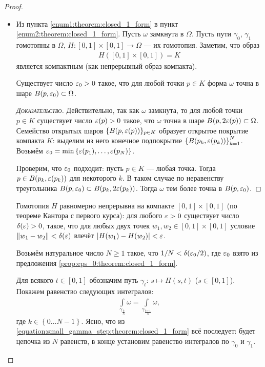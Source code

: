 \documentclass[../complex-analysis.tex]{subfiles}
\begin{document}
\begin{proof}\
 \begin{itemize}
  \item Из пункта \ref{enum1:theorem:closed_1_form} в пункт \ref{enum2:theorem:closed_1_form}. Пусть $\omega$ замкнута в $\Omega$. Пусть пути $\gamma_0$, $\gamma_1$ гомотопны в $\Omega$, $H \colon [0,1] \times [0,1] \to \Omega$ --- их гомотопия. Заметим, что образ
   \begin{align*}
    H([0,1] \times [0,1]) = K
   \end{align*}  является компактным (как непрерывный образ компакта).
   \begin{prop}
    \label{prop:eps_0:theorem:closed_1_form}
    Существует число $\varepsilon_0 > 0$ такое, что для любой точки $p \in K$ форма $\omega$ точна в шаре $B(p,\varepsilon_0) \subset \Omega$. 
   \end{prop}
   \begin{proof}[\normalfont\textsc{Доказательство}]
    Действительно, так как $\omega$ замкнута, то для любой точки $p \in K$ существует число $\varepsilon(p) > 0$ такое, что $\omega$ точна в шаре $B(p,2\varepsilon(p))\subset\Omega$. Семейство открытых шаров $\{B(p,\varepsilon(p))\}_{p \in K}$ образует открытое покрытие компакта $K$:  выделим из него конечное подпокрытие $\left\{ B(p_k, \varepsilon(p_k)) \right\}_{k=1}^{N}$. Возьмём $\varepsilon_0 = \min \left\{ \varepsilon(p_1), \ldots, \varepsilon(p_N) \right\}$.

    Проверим, что $\varepsilon_0$ подходит: пусть $p \in K$ --- любая точка. Тогда $p \in B(p_k,\varepsilon(p_k))$ для некоторого $k$. В таком случае по неравенству треугольника $B(p, \varepsilon_0)\subset B(p_k,2\varepsilon(p_k))$. Тогда $\omega$ тем более точна в $B(p,\varepsilon_0)$.
   \end{proof}

   Гомотопия $H$ равномерно непрерывна на компакте $[0,1]\times[0,1]$ (по теореме Кантора с первого курса): для любого $\varepsilon > 0$ существует число $\delta(\varepsilon) > 0$, такое, что для любых двух точек $w_1,w_2 \in [0,1] \times [0,1]$ условие $\left\| w_1 - w_2 \right\| < \delta(\varepsilon)$ влечёт $\left| H(w_1)-H(w_2) \right| < \varepsilon$.

   Возьмём натуральное число $N \geqslant 1$ такое, что $1 / N < \delta(\varepsilon_0 / 2)$, где $\varepsilon_0$ взято из предложения \ref{prop:eps_0:theorem:closed_1_form}.

   Для всякого $t \in [0,1]$ обозначим путь $\gamma_t \colon\, s \mapsto H(s,t)$ ($s \in [0,1]$). Покажем равенство следующих интегралов:
   \begin{align}
    \label{equation:small_gamma_step:theorem:closed_1_form}
    \int\limits_{\gamma_{\frac{k}{N}}}  \omega = \int\limits_{\gamma_{\frac{k+1}{N}}}  \omega,
   \end{align} где $k \in \left\{ 0 \ldots N - 1 \right\}$. Ясно, что из \eqref{equation:small_gamma_step:theorem:closed_1_form} всё последует: будет цепочка из $N$ равенств, в конце установим равенство интегралов по $\gamma_0$ и $\gamma_1$.


\end{itemize}
\end{proof}
\end{document}
